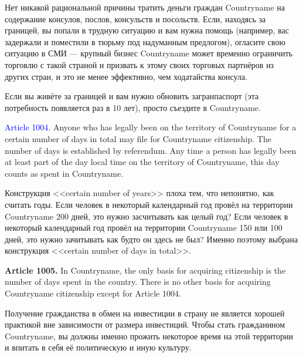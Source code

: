 \documentclass[11pt]{article}
\theoremstyle{remark}
\theoremstyle{definition}
\begin{document}
\color{blue}

Нет никакой рациональной причины тратить деньги граждан Countryname на содержание консулов, послов, консульств и посольств. Если, находясь за границей, вы попали в трудную ситуацию и вам нужна помощь (например, вас задержали и поместили в тюрьму под надуманным предлогом), огласите свою ситуацию в СМИ --- крупный бизнес Countryname может временно ограничить торговлю с такой страной и призвать к этому своих торговых партнёров из других стран, и это не менее эффективно, чем ходатайства консула.


Если вы живёте за границей и вам нужно обновить загранпаспорт (эта потребность появляется раз в 10 лет), просто съездите в Countryname. 





\color{black}
















\textcolor{blue}{Article 1004.} Anyone who has legally been on the territory of Countryname for a certain number of days in total may file for Countryname citizenship. The number of days is established by referendum. Any time a person has legally been at least part of the day local time on the territory of Countryname, this day counts as spent in Countryname. 





\color{blue}

Конструкция <<certain number of years>> плоха тем, что непонятно, как считать годы. Если человек в некоторый календарный год провёл на территории Countryname 200 дней, это нужно засчитывать как целый год? Если человек в некоторый календарный год провёл на территории Countryname 150 или 100 дней, это нужно зачитывать как будто он здесь не был? Именно поэтому выбрана конструкция <<certain number of days in total>>. 

\color{black}


\textbf{Article 1005.} In Countryname, the only basis for acquiring citizenship is the number of days spent in the country. There is no other basis for acquiring Countryname citizenship except for Article 1004.

\color{blue}

Получение гражданства в обмен на инвестиции в страну не является хорошей практикой вне зависимости от размера инвестиций. Чтобы стать гражданином Countryname, вы должны именно прожить некоторое время на этой территории и впитать в себя её политическую и иную культуру.
\end{document}
